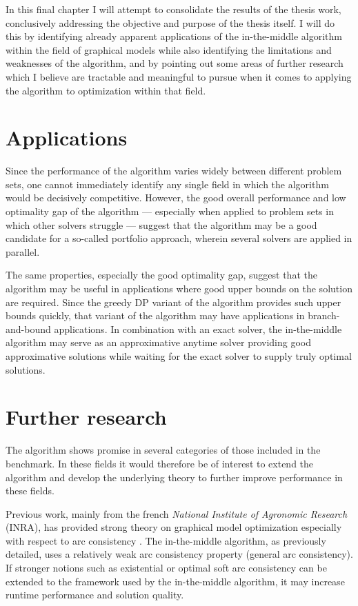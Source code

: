 In this final chapter I will attempt to consolidate the results of the thesis work, conclusively addressing the objective and purpose of the thesis itself.
I will do this by identifying already apparent applications of the in-the-middle algorithm within the field of graphical models while also identifying the limitations and weaknesses of the algorithm, and by pointing out some areas of further research which I believe are tractable and meaningful to pursue when it comes to applying the algorithm to optimization within that field.

\section{Applications}
Since the performance of the algorithm varies widely between different problem sets, one cannot immediately identify any single field in which the algorithm would be decisively competitive.
However, the good overall performance and low optimality gap of the algorithm --- especially when applied to problem sets in which other solvers struggle --- suggest that the algorithm may be a good candidate for a so-called portfolio approach, wherein several solvers are applied in parallel.

The same properties, especially the good optimality gap, suggest that the algorithm may be useful in applications where good upper bounds on the solution are required.
Since the greedy DP variant of the algorithm provides such upper bounds quickly, that variant of the algorithm may have applications in branch-and-bound applications.
In combination with an exact solver, the in-the-middle algorithm may serve as an approximative anytime solver providing good approximative solutions while waiting for the exact solver to supply truly optimal solutions.


\section{Further research}
The algorithm shows promise in several categories of those included in the benchmark.
In these fields it would therefore be of interest to extend the algorithm and develop the underlying theory to further improve performance in these fields.

Previous work, mainly from the french \emph{National Institute of Agronomic Research} (INRA), has provided strong theory on graphical model optimization especially with respect to arc consistency \parencite{Cooper10,Cooper08,deGivry06,deGivry05}.
The in-the-middle algorithm, as previously detailed, uses a relatively weak arc consistency property (general arc consistency).
If stronger notions such as existential \parencite{deGivry05} or optimal soft \parencite{Cooper10} arc consistency can be extended to the framework used by the in-the-middle algorithm, it may increase runtime performance and solution quality.

